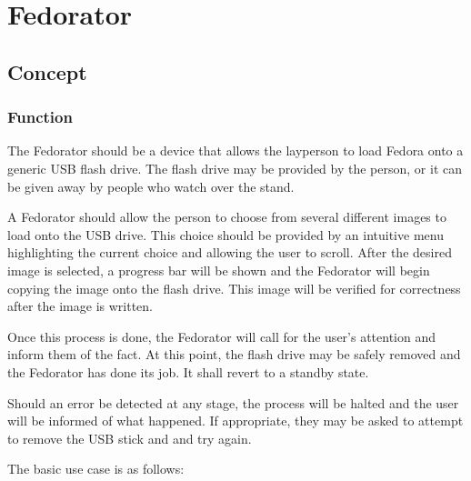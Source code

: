 \chapter{Fedorator}
    \section{Concept}
        \subsection{Function}
            
            The Fedorator should be a device that allows the layperson to load Fedora onto a generic USB flash drive.  The flash drive may be provided by the person, or it can be given away by people who watch over the stand.
            
            A Fedorator should allow the person to choose from several different images to load onto the USB drive.  This choice should be provided by an intuitive menu highlighting the current choice and allowing the user to scroll.  After the desired image is selected, a progress bar will be shown and the Fedorator will begin copying the image onto the flash drive.  This image will be verified for correctness after the image is written.
            
            Once this process is done, the Fedorator will call for the user's attention and inform them of the fact.  At this point, the flash drive may be safely removed and the Fedorator has done its job.  It shall revert to a standby state.
            
            Should an error be detected at any stage, the process will be halted and the user will be informed of what happened.  If appropriate, they may be asked to attempt to remove the USB stick and  and try again.
            
            The basic use case is as follows:
            
